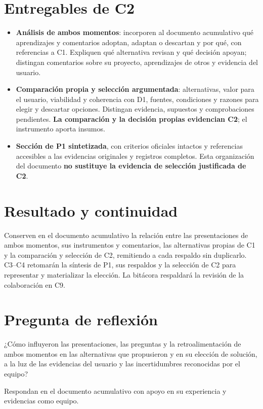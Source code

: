 \section*{Entregables de C2}
\begin{itemize}
\item \textbf{Análisis de ambos momentos}: incorporen al documento acumulativo qué aprendizajes y comentarios adoptan, adaptan o descartan y por qué, con referencias a C1. Expliquen qué alternativa revisan y qué decisión apoyan; distingan comentarios sobre su proyecto, aprendizajes de otros y evidencia del usuario.
\item \textbf{Comparación propia y selección argumentada}: alternativas, valor para el usuario, viabilidad y coherencia con D1, fuentes, condiciones y razones para elegir y descartar opciones. Distingan evidencia, supuestos y comprobaciones pendientes. \textbf{La comparación y la decisión propias evidencian C2}; el instrumento aporta insumos.
\item \textbf{Sección de P1 sintetizada}, con criterios oficiales intactos y referencias accesibles a las evidencias originales y registros completos. Esta organización del documento \textbf{no sustituye la evidencia de selección justificada de C2}.
\end{itemize}

\section*{Resultado y continuidad}
Conserven en el documento acumulativo la relación entre las presentaciones de ambos momentos, sus instrumentos y comentarios, las alternativas propias de C1 y la comparación y selección de C2, remitiendo a cada respaldo sin duplicarlo. C3--C4 retomarán la síntesis de P1, sus respaldos y la selección de C2 para representar y materializar la elección. La bitácora respaldará la revisión de la colaboración en C9.

\section*{Pregunta de reflexión}
¿Cómo influyeron las presentaciones, las preguntas y la retroalimentación de ambos momentos en las alternativas que propusieron y en su elección de solución, a la luz de las evidencias del usuario y las incertidumbres reconocidas por el equipo?

Respondan en el documento acumulativo con apoyo en su experiencia y evidencias como equipo.


